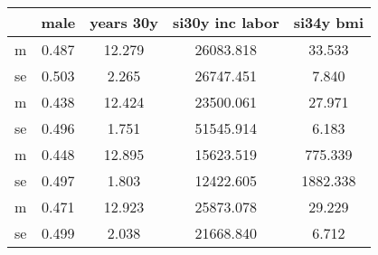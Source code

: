 \begin{table}[htbp]
\begin{tabular}{lcccc} \hline \hline
 & male  & years 30y  & si30y inc labor  & si34y bmi  \\  \hline 
m &     0.487 &    12.279 & 26083.818 &    33.533 \\  
se &     0.503 &     2.265 & 26747.451 &     7.840 \\  
m &     0.438 &    12.424 & 23500.061 &    27.971 \\  
se &     0.496 &     1.751 & 51545.914 &     6.183 \\  
m &     0.448 &    12.895 & 15623.519 &   775.339 \\  
se &     0.497 &     1.803 & 12422.605 &  1882.338 \\  
m &     0.471 &    12.923 & 25873.078 &    29.229 \\  
se &     0.499 &     2.038 & 21668.840 &     6.712 \\  
\hline \hline \end{tabular}
\end{table}

